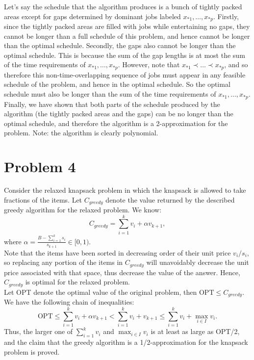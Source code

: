 \documentclass{article}
\begin{document}
Let's say the schedule that the algorithm produces is a bunch of tightly packed areas except for gaps determined by dominant jobs labeled $x_{*1}, \ldots,x_{*p}$. Firstly, since the tightly packed areas are filled with jobs while entertaining no gaps, they cannot be longer than a full schedule of this problem, and hence cannot be longer than the optimal schedule. Secondly, the gaps also cannot be longer than the optimal schedule. This is because the sum of the gap lengths is at most the sum of the time requirements of $x_{*1}, \ldots,x_{*p} $. However, note that $x_{*1} \prec \ldots \prec x_{*p}$, and so therefore this non-time-overlapping sequence of jobs must appear in any feasible schedule of the problem, and hence in the optimal schedule. So the optimal schedule must also be longer than the sum of the time requirements of $x_{*1}, \ldots,x_{*p} $. Finally, we have shown that both parts of the schedule produced by the algorithm (the tightly packed areas and the gaps) can be no longer than the optimal schedule, and therefore the algorithm is a 2-approximation for the problem. Note: the algorithm is clearly polynomial.

\section*{Problem 4}

Consider the relaxed knapsack problem in which the knapsack is allowed to take fractions of the items. Let $C_{greedy}$ denote the value returned by the described greedy algorithm for the relaxed problem. We know: 
$$C_{greedy} = \sum_{i = 1}^{k}v_i + \alpha v_{k+1},$$
where $\alpha = \frac{B - \sum_{i=1}^{k}s_i}{s_{k+1}} \in [0, 1)$. \\
Note that the items have been sorted in decreasing order of their unit price $v_i/s_i$, so replacing any portion of the items in $C_{greedy}$ will unavoidably decrease the unit price associated with that space, thus decrease the value of the answer. Hence, $C_{greedy}$ is optimal for the relaxed problem. \\
Let OPT denote the optimal value of the original problem, then $\mathrm{OPT} \leq C_{greedy}$. We have the following chain of inequalities:
$$\text{OPT} \leq \sum_{i=1}^{k}v_i + \alpha v_{k+1} < \sum_{i=1}^{k}v_i + v_{k+1} 
	  \leq \sum_{i=1}^{k}v_i + \max_{i \in I}v_i.$$
Thus, the larger one of $\sum_{i=1}^{k}v_i$ and $\max_{i \in I}v_i$ is at least as large as OPT/2, and the claim that the greedy algorithm is a 1/2-approximation for the knapsack problem is proved.
\end{document}
